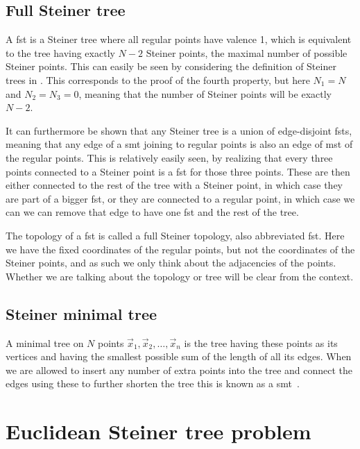 \subsection{Full Steiner tree}
\label{sec:full-steiner-tree}

A \gls{fst} is a Steiner tree where all regular points have valence 1, which is
equivalent to the tree having exactly $N-2$ Steiner points, the maximal number
of possible Steiner points. This can easily be seen by considering the
definition of Steiner trees in . This corresponds to the
proof of the fourth property, but here $N_1 = N$ and $N_2 = N_3 = 0$, meaning
that the number of Steiner points will be exactly $N-2$.

It can furthermore be shown that any Steiner tree is a union of edge-disjoint
\glspl{fst}, meaning that any edge of a \gls{smt} joining to regular points is also
an edge of \gls{mst} of the regular points. This is relatively easily seen, by
realizing that every three points connected to a Steiner point is a \gls{fst} for
those three points. These are then either connected to the rest of the tree with
a Steiner point, in which case they are part of a bigger \gls{fst}, or they are
connected to a regular point, in which case we can we can remove that edge to
have one \gls{fst} and the rest of the tree.

The topology of a \gls{fst} is called a full Steiner topology, also abbreviated
\gls{fst}. Here we have the fixed coordinates of the regular points, but not the
coordinates of the Steiner points, and as such we only think about the
adjacencies of the points. Whether we are talking about the topology or tree
will be clear from the context.

\subsection{Steiner minimal tree}
\label{sec:steiner-minimal-tree}

A minimal tree on $N$ points $\vec{x}_{1},\vec{x}_{2},\ldots,\vec{x}_{n}$ is the
tree having these points as its vertices and having the smallest possible sum of
the length of all its edges. When we are allowed to insert any number of extra
points into the tree and connect the edges using these to further shorten the
tree this is known as a \gls{smt}~\cite{Gilbert1968}.


\section{Euclidean Steiner tree problem}
\label{sec:eucl-stein-tree}

